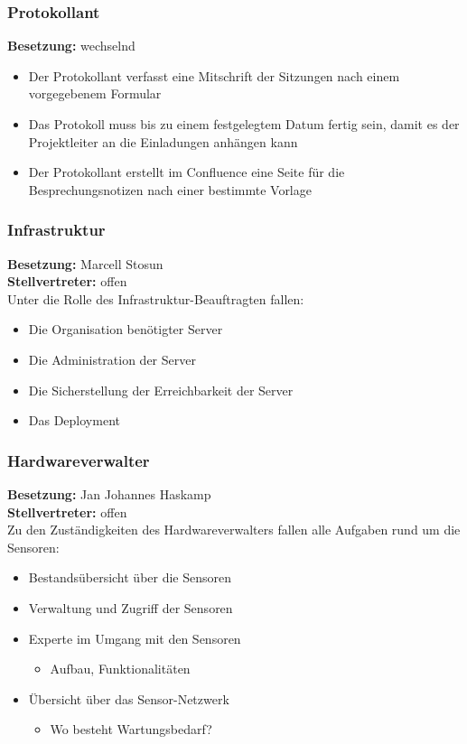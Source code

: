 \subsubsection{Protokollant}
\textbf{Besetzung:} wechselnd \\
\begin{itemize}
	\item Der Protokollant verfasst eine Mitschrift der Sitzungen nach einem vorgegebenem Formular
	\item Das Protokoll muss bis zu einem festgelegtem Datum fertig sein, damit es der Projektleiter an die Einladungen anhängen kann
	\item Der Protokollant erstellt im Confluence eine Seite für die Besprechungsnotizen nach einer bestimmte Vorlage
\end{itemize}

\subsubsection{Infrastruktur}
\textbf{Besetzung:} Marcell Stosun \\
\textbf{Stellvertreter:} offen \\
Unter die Rolle des Infrastruktur-Beauftragten fallen:
\begin{itemize}
	\item Die Organisation benötigter Server
	\item Die Administration der Server
	\item Die Sicherstellung der Erreichbarkeit der Server
	\item Das Deployment
\end{itemize}

\subsubsection{Hardwareverwalter}
\textbf{Besetzung:} Jan Johannes Haskamp \\
\textbf{Stellvertreter:} offen \\
Zu den Zuständigkeiten des Hardwareverwalters fallen alle Aufgaben rund um die Sensoren:
\begin{itemize}
	\item Bestandsübersicht über die Sensoren
	\item Verwaltung und Zugriff der Sensoren
	\item Experte im Umgang mit den Sensoren 
	\begin{itemize}
		\item Aufbau, Funktionalitäten
	\end{itemize}
	\item Übersicht über das Sensor-Netzwerk
	\begin{itemize}
		\item Wo besteht Wartungsbedarf?
	\end{itemize}
	
\end{itemize}

